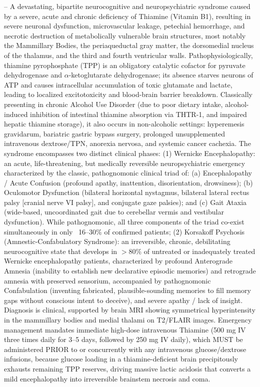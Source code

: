-- A devastating, bipartite neurocognitive and neuropsychiatric syndrome caused by a severe, acute and chronic deficiency of Thiamine (Vitamin B1), resulting in severe neuronal dysfunction, microvascular leakage, petechial hemorrhage, and necrotic destruction of metabolically vulnerable brain structures, most notably the Mammillary Bodies, the periaqueductal gray matter, the dorsomedial nucleus of the thalamus, and the third and fourth ventricular walls. Pathophysiologically, thiamine pyrophosphate (TPP) is an obligatory catalytic cofactor for pyruvate dehydrogenase and $\alpha$-ketoglutarate dehydrogenase; its absence starves neurons of ATP and causes intracellular accumulation of toxic glutamate and lactate, leading to localized excitotoxicity and blood-brain barrier breakdown. Classically presenting in chronic Alcohol Use Disorder (due to poor dietary intake, alcohol-induced inhibition of intestinal thiamine absorption via THTR-1, and impaired hepatic thiamine storage), it also occurs in non-alcoholic settings: hyperemesis gravidarum, bariatric gastric bypass surgery, prolonged unsupplemented intravenous dextrose/TPN, anorexia nervosa, and systemic cancer cachexia. The syndrome encompasses two distinct clinical phases: (1) Wernicke Encephalopathy: an acute, life-threatening, but medically reversible neuropsychiatric emergency characterized by the classic, pathognomonic clinical triad of: (a) Encephalopathy / Acute Confusion (profound apathy, inattention, disorientation, drowsiness); (b) Oculomotor Dysfunction (bilateral horizontal nystagmus, bilateral lateral rectus palsy [cranial nerve VI palsy], and conjugate gaze palsies); and (c) Gait Ataxia (wide-based, uncoordinated gait due to cerebellar vermis and vestibular dysfunction). While pathognomonic, all three components of the triad co-exist simultaneously in only ~16--30\% of confirmed patients; (2) Korsakoff Psychosis (Amnestic-Confabulatory Syndrome): an irreversible, chronic, debilitating neurocognitive state that develops in $>80\%$ of untreated or inadequately treated Wernicke encephalopathy patients, characterized by profound Anterograde Amnesia (inability to establish new declarative episodic memories) and retrograde amnesia with preserved sensorium, accompanied by pathognomonic Confabulation (inventing fabricated, plausible-sounding memories to fill memory gaps without conscious intent to deceive), and severe apathy / lack of insight. Diagnosis is clinical, supported by brain MRI showing symmetrical hyperintensity in the mammillary bodies and medial thalami on T2/FLAIR images. Emergency management mandates immediate high-dose intravenous Thiamine (500 mg IV three times daily for 3--5 days, followed by 250 mg IV daily), which MUST be administered PRIOR to or concurrently with any intravenous glucose/dextrose infusions, because glucose loading in a thiamine-deficient brain precipitously exhausts remaining TPP reserves, driving massive lactic acidosis that converts a mild encephalopathy into irreversible brainstem necrosis and coma.

